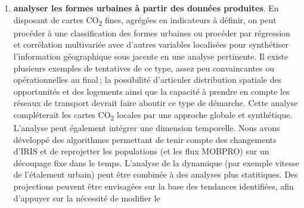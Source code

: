 \documentclass[
  french,
  9pt,
  a4paper,
  DIV=11,
  twoside=semi]{scrreprt}
\begin{document}
\begin{enumerate}
  alimenter le débat sur l'aménagement, dans ses dimensions
  environnementales mais aussi sociales. Ces éléments sont à l'échelle
  fine du carreau 200m\$\times\$200m, appuyés sur les données du
  recensement MOBPRO et de Fluxvision (voir 1.). Ces analyses sont dans
  la prolongation de l'analyse des flux de mobilités pour la Rochelle ou
  \hyperref[0]{Aix-Marseille-Provence} -- où l'analyse a été étendue du
  seul motif mobilité professionnelle à l'ensemble des motifs en
  utilisant l'EMC\textsuperscript{2}. Les données Fluxvision peuvent
  apporter une meilleure robustesse par une mesure fréquente et
  exhaustive. Les matrices de flux permettent de générer des cartes
  d'émissions de CO\textsubscript{2} imputées aux résidents et sont un
  bon résumé de la structure des territoires. Le principe est celui de
  la diffusion en source ouverte d'un certain nombre d'informations, à
  affiner en fonction des objectifs (de prestations autour de ces
  concepts, par exemple des simulations à partir du modèle de scénarios,
  des analyses plus fines des comportements, l'analyse multi-motifs si
  EMC\textsuperscript{2}) et des possibilités de réutilisation des
  données sources (par exemple, les analyses sociologiques fines
  demandent l'utilisation de Fidéli, mais limitent les rediffusions).
\item
  \textbf{analyser les formes urbaines à partir des données produites}.
  En disposant de cartes CO\textsubscript{2} fines, agrégées en
  indicateurs à définir, on peut procéder à une classification des
  formes urbaines ou procéder par régression et corrélation multivariée
  avec d'autres variables localisées pour synthétiser l'information
  géographique sous jacente en une analyse pertinente. Il existe
  plusieurs exemples de tentatives de ce type, assez peu convaincantes
  ou opérationnelles au final\,; la possibilité d'articuler distribution
  spatiale des opportunités et des logements ainsi que la capacité à
  prendre en compte les réseaux de transport devrait faire aboutir ce
  type de démarche. Cette analyse compléterait les cartes
  CO\textsubscript{2} locales par une approche globale et synthétique.
  L'analyse peut également intégrer une dimension temporelle. Nous avons
  développé des algorithmes permettant de tenir compte des changements
  d'IRIS et de reprojetter les populations (et les flux MOBPRO) sur un
  découpage fixe dans le temps. L'analyse de la dynamique (par exemple
  vitesse de l'étalement urbain) peut être combinée à des analyses plus
  statitiques. Des projections peuvent être envisagées sur la base des
  tendances identifiées, afin d'appuyer sur la nécessité de modifier le

\end{enumerate}
\end{document}
